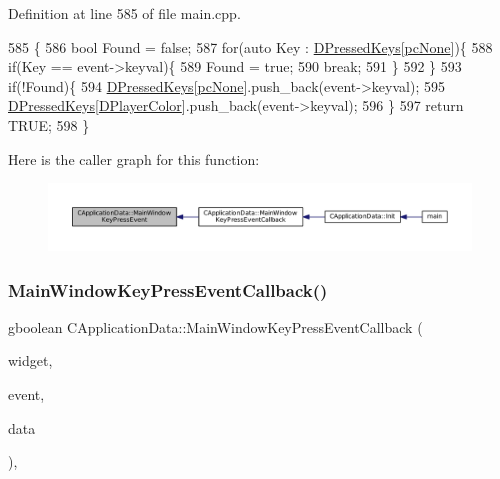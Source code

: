 Definition at line 585 of file main.\+cpp.


\begin{DoxyCode}
585                                                                                        \{
586     \textcolor{keywordtype}{bool} Found = \textcolor{keyword}{false};
587     \textcolor{keywordflow}{for}(\textcolor{keyword}{auto} Key : \hyperlink{classCApplicationData_ac6f50c764f7561c0bd2a9fbce55b2701}{DPressedKeys}[\hyperlink{GameDataTypes_8h_aafb0ca75933357ff28a6d7efbdd7602fa88767aa8e02c7b3192bbab4127b3d729}{pcNone}])\{
588         \textcolor{keywordflow}{if}(Key == event->keyval)\{
589             Found = \textcolor{keyword}{true};
590             \textcolor{keywordflow}{break};
591         \}
592     \}
593     \textcolor{keywordflow}{if}(!Found)\{
594         \hyperlink{classCApplicationData_ac6f50c764f7561c0bd2a9fbce55b2701}{DPressedKeys}[\hyperlink{GameDataTypes_8h_aafb0ca75933357ff28a6d7efbdd7602fa88767aa8e02c7b3192bbab4127b3d729}{pcNone}].push\_back(event->keyval);
595         \hyperlink{classCApplicationData_ac6f50c764f7561c0bd2a9fbce55b2701}{DPressedKeys}[\hyperlink{classCApplicationData_a53550939b20cba70570f113e4d1c5d02}{DPlayerColor}].push\_back(event->keyval);
596     \}
597     \textcolor{keywordflow}{return} TRUE;
598 \}
\end{DoxyCode}
Here is the caller graph for this function\+:\nopagebreak
\begin{figure}[H]
\begin{center}
\leavevmode
\includegraphics[width=350pt]{classCApplicationData_a9b451765c93ecf00322f5450d29bfffe_icgraph}
\end{center}
\end{figure}
\hypertarget{classCApplicationData_aca6cce5b1cd5142984d2880294ff6ed4}{}\label{classCApplicationData_aca6cce5b1cd5142984d2880294ff6ed4} 
\subsubsection{\texorpdfstring{Main\+Window\+Key\+Press\+Event\+Callback()}{MainWindowKeyPressEventCallback()}}
{\footnotesize\ttfamily gboolean C\+Application\+Data\+::\+Main\+Window\+Key\+Press\+Event\+Callback (\begin{DoxyParamCaption}\item[{Gtk\+Widget $\ast$}]{widget,  }\item[{Gdk\+Event\+Key $\ast$}]{event,  }\item[{gpointer}]{data }\end{DoxyParamCaption})\hspace{0.3cm}{\ttfamily [static]}, {\ttfamily [protected]}}



